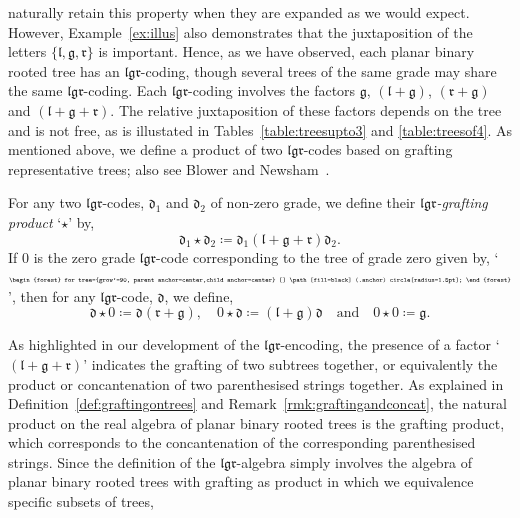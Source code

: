 \documentclass[5p,twocolumn]{elsarticle}
\newcommand*{\el}{\mathfrak l}
\newcommand*{\gl}{\mathfrak g}
\newcommand*{\rl}{\mathfrak r}
\newcommand*{\df}{\mathfrak d}
\begin{document}
naturally retain this property when they are expanded as we would expect. 
However, Example~\ref{ex:illus} also demonstrates that the juxtaposition of the letters $\{\el,\gl,\rl\}$ is important.
Hence, as we have observed, each planar binary rooted tree has an $\el\gl\rl$-coding, though several trees of the same grade may share the same $\el\gl\rl$-coding. 
Each $\el\gl\rl$-coding involves the factors $\gl$, $(\el+\gl)$, $(\rl+\gl)$ and $(\el+\gl+\rl)$.
The relative juxtaposition of these factors depends on the tree and is not free, as is illustated in Tables~\ref{table:treesupto3} and \ref{table:treesof4}.
As mentioned above, we define a product of two $\el\gl\rl$-codes based on grafting representative trees; also see Blower and Newsham~\cite[Def.~4.3]{BN}.
%
\begin{definition}[$\el\gl\rl$-grafting product]\label{def:lgrgrafting}
  For any two $\el\gl\rl$-codes, $\df_1$ and $\df_2$ of non-zero grade, we define their $\el\gl\rl$\emph{-grafting product} `$\star$' by,
  \begin{equation*}
    \df_1\star\df_2\coloneqq\df_1(\el+\gl+\rl)\df_2.
  \end{equation*}
  If $\mathfrak 0$ is the zero grade $\el\gl\rl$-code corresponding to the tree of grade zero given by,
  `${\tiny \begin{forest} for tree={grow'=90, parent anchor=center,child anchor=center} [] \path[fill=black] (.anchor) circle[radius=1.5pt]; \end{forest}}$',
  then for any $\el\gl\rl$-code, $\df$, we define,
  \begin{equation*}
    \df\star\mathfrak{0}\coloneqq\df(\rl+\gl),\quad\mathfrak{0}\star\df\coloneqq(\el+\gl)\df\quad\text{and}\quad\mathfrak{0}\star\mathfrak{0}\coloneqq\gl.
  \end{equation*}
\end{definition}
%
As highlighted in our development of the $\el\gl\rl$-encoding, the presence of a factor `$(\el+\gl+\rl)$' indicates the grafting of two subtrees together,
or equivalently the product or concantenation of two parenthesised strings together.
As explained in Definition~\ref{def:graftingontrees} and Remark~\ref{rmk:graftingandconcat}, the natural product on the real algebra of planar binary rooted trees is the grafting product,
which corresponds to the concantenation of the corresponding parenthesised strings.
Since the definition of the $\el\gl\rl$-algebra simply involves the algebra of planar binary rooted trees with grafting as product in which we equivalence specific subsets of trees, 
\end{document}
